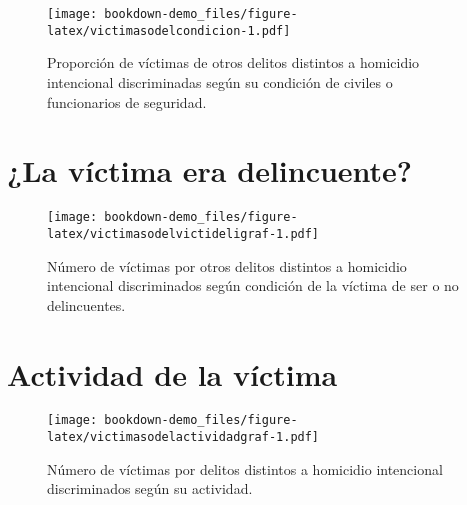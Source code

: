 \documentclass[
]{book}
\begin{document}
\begin{figure}
\centering
\texttt{[image: bookdown-demo\_files/figure-latex/victimasodelcondicion-1.pdf]}
\caption{\label{fig:victimasodelcondicion}Proporción de víctimas de otros delitos distintos a homicidio intencional discriminadas según su condición de civiles o funcionarios de seguridad.}
\end{figure}

\hypertarget{la-vuxedctima-era-delincuente-2}{%
\section{¿La víctima era delincuente?}\label{la-vuxedctima-era-delincuente-2}}



\begin{figure}
\centering
\texttt{[image: bookdown-demo\_files/figure-latex/victimasodelvictideligraf-1.pdf]}
\caption{\label{fig:victimasodelvictideligraf}Número de víctimas por otros delitos distintos a homicidio intencional discriminados según condición de la víctima de ser o no delincuentes.}
\end{figure}

\hypertarget{actividad-de-la-vuxedctima-2}{%
\section{Actividad de la víctima}\label{actividad-de-la-vuxedctima-2}}



\begin{figure}
\centering
\texttt{[image: bookdown-demo\_files/figure-latex/victimasodelactividadgraf-1.pdf]}
\caption{\label{fig:victimasodelactividadgraf}Número de víctimas por delitos distintos a homicidio intencional discriminados según su actividad.}
\end{figure}
\end{document}
